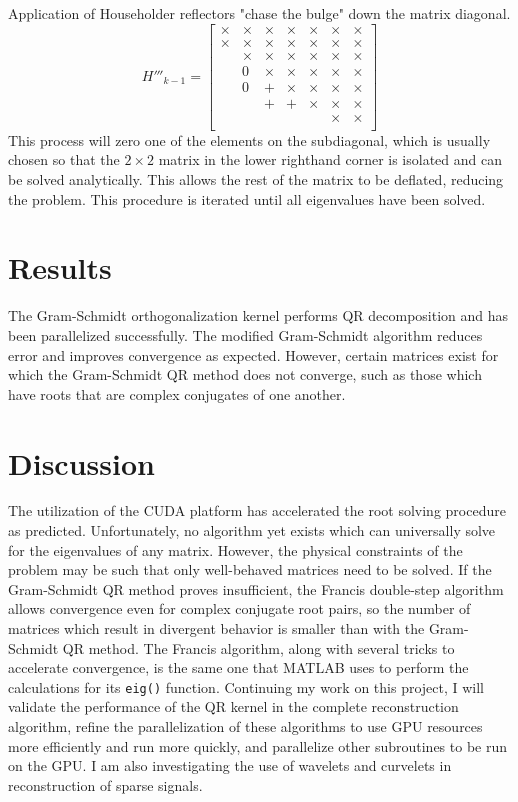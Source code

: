 \documentclass{article}
\begin{document}
Application of Householder reflectors "chase the bulge" down the matrix diagonal.
$$H'''_{k-1}=\left[\begin{array}{ccccccc}
\times & \times & \times & \times & \times & \times & \times \\
\times & \times & \times & \times & \times & \times & \times \\
& \times & \times & \times & \times & \times & \times \\
& 0 & \times & \times & \times & \times & \times \\
& 0 & + & \times & \times & \times & \times  \\
&& + & + & \times & \times & \times \\
&&&&& \times & \times \\
\end{array}\right]$$
This process will zero one of the elements on the subdiagonal, which is usually chosen so that the $2\times2$ matrix in the lower righthand corner is isolated and can be solved analytically. This allows the rest of the matrix to be deflated, reducing the problem. This procedure is iterated until all eigenvalues have been solved.

\section*{Results}

The Gram-Schmidt orthogonalization kernel performs QR decomposition and has been parallelized successfully. The modified Gram-Schmidt algorithm reduces error and improves convergence as expected. However, certain matrices exist for which the Gram-Schmidt QR method does not converge, such as those which have roots that are complex conjugates of one another. 

\section*{Discussion}

The utilization of the CUDA platform has accelerated the root solving procedure as predicted. Unfortunately, no algorithm yet exists which can universally solve for the eigenvalues of any matrix. However, the physical constraints of the problem may be such that only well-behaved matrices need to be solved. If the Gram-Schmidt QR method proves insufficient, the Francis double-step algorithm allows convergence even for complex conjugate root pairs, so the number of matrices which result in divergent behavior is smaller than with the Gram-Schmidt QR method. The Francis algorithm, along with several tricks to accelerate convergence, is the same one that MATLAB uses to perform the calculations for its \texttt{eig()} function. Continuing my work on this project, I will validate the performance of the QR kernel in the complete reconstruction algorithm, refine the parallelization of these algorithms to use GPU resources more efficiently and run more quickly, and parallelize other subroutines to be run on the GPU. I am also investigating the use of wavelets and curvelets in reconstruction of sparse signals.
\end{document}
